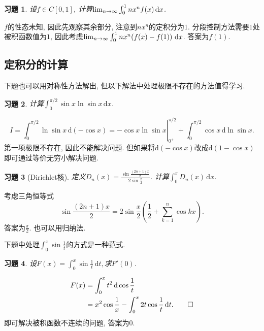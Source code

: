 \documentclass[11pt,a4paper]{ctexart}
\makeatletter
\theoremstyle{thmseries} %
\theoremstyle{exerseries}
\newtheorem{exer}{习题}[section]
\renewenvironment{proof}[1][\proofname]{\par
  \pushQED{\qed}%
  \normalfont \topsep6\p@\@plus6\p@\relax
  \trivlist
  \item[\hskip\labelsep
        \itshape
    #1\@addpunct{}]\ignorespaces
}{%
  \popQED\endtrivlist\@endpefalse
}
\newenvironment{sol}{\begin{proof}[\bfseries\upshape 解\quad]}{\end{proof}}
\newcommand{\bra}[1]{\mathopen{}\left(#1\right)}
\renewcommand{\d}{\mathrm{d}}
\def \nti {\mathnormal{n}\to\infty}
\makeatother
\begin{document}
\begin{exer}
	设$f\in C[0,1]$, 计算$\lim_{\nti}\int_{0}^{1}nx^nf(x)\,\d x$. 
\end{exer}
\begin{sol}
	$f$的性态未知, 因此先观察其余部分, 注意到$nx^n$的定积分为$1$. 分段控制方法需要$1$处被积函数值为$1$, 因此考虑$\lim_{\nti}\int_{0}^{1}nx^n\bra{f(x)-f(1)}\,\d x$. 答案为$f(1)$. 
\end{sol}


\subsection{定积分的计算}
下题也可以用对称性方法解出, 但以下解法中处理极限不存在的方法值得学习. 
\begin{exer}
	计算$\int_{0}^{\pi/2}\sin x\ln\sin x\,\d x$. 
\end{exer}
\begin{sol}
	\[\left.I=\int_{0}^{\pi/2}\ln\sin x\,\d(-\cos x)=-\cos x\ln\sin x\right|_{0^+}^{\pi/2}+\int_{0}^{\pi/2}\cos x\,\d\ln\sin x.\]
	第一项极限不存在, 因此不能解决问题. 但如果将$\d(-\cos x)$改成$\d(1-\cos x)$即可通过等价无穷小解决问题. 
\end{sol}

\begin{exer}[Dirichlet核]
	定义$D_n(x)=\frac{\sin\frac{(2n+1)x}{2}}{2\sin\frac{x}{2}}$. 计算$\int_{0}^{\pi}D_n(x)\,\d x$. 
\end{exer}
\begin{sol}
	考虑三角恒等式
	\[\sin\frac{(2n+1)x}{2}=2\sin\frac{x}{2}\bra{\frac{1}{2}+\sum_{k=1}^{n}\cos kx}.\]
	答案为$\frac{\pi}{2}$. 也可以用归纳法. 
\end{sol}


下题中处理$\int_{0}^{x}\sin\frac{1}{t}$的方式是一种范式. 
\begin{exer}
	设$F(x)=\int_{0}^{x}\sin\frac{1}{t}\,\d t,$求$F'(0)$. 
\end{exer}
\begin{sol}
	\begin{align*}
		F(x)&=\int_{0}^{x}t^2\,\d\cos\frac{1}{t}\\
		&=x^2\cos\frac{1}{x}-\int_{0}^{x}2t\cos\frac{1}{t}\,\d t.\qedhere
	\end{align*}
	即可解决被积函数不连续的问题, 答案为$0$. 
\end{sol}
\end{document}
